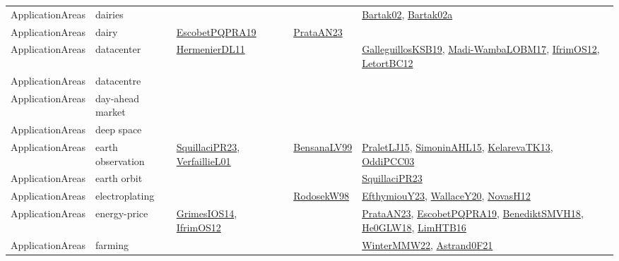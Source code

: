 {\begin{longtable}{lp{3cm}>{\raggedright}p{6cm}>{\raggedright}p{6cm}p{8cm}}
ApplicationAreas & dairies &  &  & \href{papers/Bartak02.pdf}{Bartak02}\cite{Bartak02}, \href{papers/Bartak02a.pdf}{Bartak02a}\cite{Bartak02a}\\
ApplicationAreas & dairy & \href{articles/EscobetPQPRA19.pdf}{EscobetPQPRA19}\cite{EscobetPQPRA19} & \href{articles/PrataAN23.pdf}{PrataAN23}\cite{PrataAN23} & \\
ApplicationAreas & datacenter & \href{papers/HermenierDL11.pdf}{HermenierDL11}\cite{HermenierDL11} &  & \href{papers/GalleguillosKSB19.pdf}{GalleguillosKSB19}\cite{GalleguillosKSB19}, \href{papers/Madi-WambaLOBM17.pdf}{Madi-WambaLOBM17}\cite{Madi-WambaLOBM17}, \href{papers/IfrimOS12.pdf}{IfrimOS12}\cite{IfrimOS12}, \href{papers/LetortBC12.pdf}{LetortBC12}\cite{LetortBC12}\\
ApplicationAreas & datacentre &  &  & \\
ApplicationAreas & day-ahead market &  &  & \\
ApplicationAreas & deep space &  &  & \\
ApplicationAreas & earth observation & \href{papers/SquillaciPR23.pdf}{SquillaciPR23}\cite{SquillaciPR23}, \href{papers/VerfaillieL01.pdf}{VerfaillieL01}\cite{VerfaillieL01} & \href{articles/BensanaLV99.pdf}{BensanaLV99}\cite{BensanaLV99} & \href{papers/PraletLJ15.pdf}{PraletLJ15}\cite{PraletLJ15}, \href{articles/SimoninAHL15.pdf}{SimoninAHL15}\cite{SimoninAHL15}, \href{papers/KelarevaTK13.pdf}{KelarevaTK13}\cite{KelarevaTK13}, \href{papers/OddiPCC03.pdf}{OddiPCC03}\cite{OddiPCC03}\\
ApplicationAreas & earth orbit &  &  & \href{papers/SquillaciPR23.pdf}{SquillaciPR23}\cite{SquillaciPR23}\\
ApplicationAreas & electroplating &  & \href{papers/RodosekW98.pdf}{RodosekW98}\cite{RodosekW98} & \href{papers/EfthymiouY23.pdf}{EfthymiouY23}\cite{EfthymiouY23}, \href{articles/WallaceY20.pdf}{WallaceY20}\cite{WallaceY20}, \href{articles/NovasH12.pdf}{NovasH12}\cite{NovasH12}\\
ApplicationAreas & energy-price & \href{articles/GrimesIOS14.pdf}{GrimesIOS14}\cite{GrimesIOS14}, \href{papers/IfrimOS12.pdf}{IfrimOS12}\cite{IfrimOS12} &  & \href{articles/PrataAN23.pdf}{PrataAN23}\cite{PrataAN23}, \href{articles/EscobetPQPRA19.pdf}{EscobetPQPRA19}\cite{EscobetPQPRA19}, \href{papers/BenediktSMVH18.pdf}{BenediktSMVH18}\cite{BenediktSMVH18}, \href{papers/He0GLW18.pdf}{He0GLW18}\cite{He0GLW18}, \href{papers/LimHTB16.pdf}{LimHTB16}\cite{LimHTB16}\\
ApplicationAreas & farming &  &  & \href{papers/WinterMMW22.pdf}{WinterMMW22}\cite{WinterMMW22}, \href{papers/Astrand0F21.pdf}{Astrand0F21}\cite{Astrand0F21}\\

\end{longtable}}
